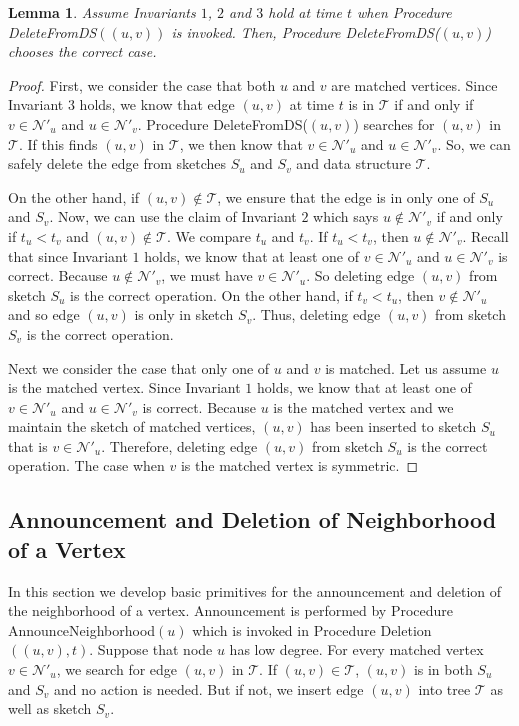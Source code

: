 \documentclass[11pt,letter]{article}
\newtheorem{lemma}[theorem]{Lemma}
\begin{document}
\begin{lemma}
\label{lem:timestamps:case:3}
Assume Invariants $1$, $2$ and $3$ hold at time $t$ when Procedure
{\sf DeleteFromDS$((u,v))$} is invoked.
Then, Procedure {\sf DeleteFromDS($(u,v)$)} chooses the correct case.
\end{lemma}

\begin{proof}
First, we consider the case that  both $u$ and $v$ are matched vertices.
Since Invariant $3$ holds, we know that edge $(u,v)$
at time $t$ is in $\mathcal{T}$ if and only if
$v\in \mathcal{N}'_u$ and $u\in \mathcal{N}'_v$.
Procedure {\sf DeleteFromDS($(u,v)$)} searches for $(u,v)$ in $\mathcal{T}$.
If this finds $(u,v)$ in $\mathcal{T}$, we then know that $v\in \mathcal{N}'_u$
and $u\in \mathcal{N}'_v$. So, we can safely delete the edge from
sketches $S_u$ and $S_v$ and data structure $\mathcal{T}$.

On the other hand, if $(u,v)\notin \mathcal{T}$, we ensure that the edge
is in only one of $S_u$ and $S_v$.  Now, we can use the claim of Invariant
$2$ which says $u\notin \mathcal{N}'_v$ if and only if $t_u < t_v$ and $(u,v) \notin\mathcal{T}$.
We compare $t_u$ and $t_v$. If $t_u<t_v$, then $u\notin \mathcal{N}'_v$.
Recall that since Invariant $1$ holds, we know that at least one of $v\in \mathcal{N}'_u$
and $u\in \mathcal{N}'_v$ is correct.
Because $u\notin \mathcal{N}'_v$, we must have $v\in \mathcal{N}'_u$.
So deleting edge $(u,v)$ from sketch $S_u$ is the correct operation.
On the other hand, if $t_v<t_u$, then $v\notin \mathcal{N}'_u$ and so
edge $(u,v)$ is only in sketch $S_v$. Thus, deleting edge $(u,v)$ from
sketch $S_v$ is the correct operation.

Next we consider the case that only one of $u$ and $v$ is matched.
Let us assume $u$ is the matched vertex.
Since Invariant $1$ holds, we know that at least one of $v\in \mathcal{N}'_u$
and $u\in \mathcal{N}'_v$ is correct. Because $u$ is the matched vertex and
we maintain the sketch of matched vertices, $(u,v)$ has been inserted to sketch
$S_u$ that is $v\in \mathcal{N}'_u$. Therefore,
deleting edge $(u,v)$ from sketch $S_u$ is the correct operation.
The case when $v$ is the matched vertex is symmetric.
\end{proof}





\subsection{Announcement and Deletion of Neighborhood of a Vertex}
In this section we develop basic primitives for the announcement
and deletion of the neighborhood of a vertex.
Announcement is performed by
Procedure {\sf AnnounceNeighborhood$(u)$} which is
invoked in Procedure {\sf Deletion$((u,v), t)$}.
Suppose that node $u$ has low degree.
For every matched vertex $v\in \mathcal{N}'_u$,
we search for edge $(u,v)$ in $\mathcal{T}$. If $(u,v)\in\mathcal{T}$,
$(u,v)$ is in both $S_u$ and $S_v$ and no action is needed.
But if not, we insert edge $(u,v)$ into tree $\mathcal{T}$ as well as
sketch $S_v$.
\end{document}
